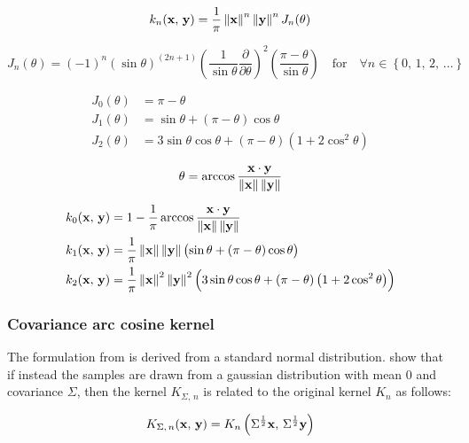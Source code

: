 \begin{equation}\label{eq:kernel_cho}
	k_n(\mathbf{x},\,\mathbf{y}) = \frac{1}{\pi} \left\lVert \mathbf{x} \right\rVert^n \left\lVert \mathbf{y} \right\rVert^n J_n(\theta)
\end{equation}

\begin{equation}
	J_n(\theta) = (-1)^n \left( \sin \theta \right)^{(2n+1)}
	\left( \frac{1}{\sin \theta} \frac{\partial}{\partial \theta} \right)^2
	\left( \frac{\pi - \theta}{\sin \theta} \right)
	\quad \text{for} \quad \forall n \in \left\{ 0,\,1,\,2,\,\dots \right\}
\end{equation}

\begin{align}
	J_0(\theta) & = \pi - \theta                                                                    \\
	J_1(\theta) & = \sin\theta + \left(\pi - \theta\right)\cos\theta                                \\
	J_2(\theta) & = 3\sin\theta\cos\theta + \left(\pi - \theta\right)\left(1 + 2\cos^2\theta\right)
\end{align}

\begin{equation}
	\theta = \arccos\frac{\mathbf{x} \cdot \mathbf{y}}{\left\lVert \mathbf{x} \right\rVert \left\lVert \mathbf{y} \right\rVert}
\end{equation}


\begin{align}
	k_0(\mathbf{x},\,\mathbf{y}) & = 1 - \frac{1}{\pi} \arccos\frac{\mathbf{x} \cdot \mathbf{y}}{\left\lVert \mathbf{x} \right\rVert \left\lVert \mathbf{y} \right\rVert} \\
	k_1(\mathbf{x},\,\mathbf{y}) & = \frac{1}{\pi} \left\lVert \mathbf{x} \right\rVert \left\lVert \mathbf{y} \right\rVert
	\bigl( \sin\theta + \left(\pi - \theta\right)\cos\theta \bigr)                                                        \\
	k_2(\mathbf{x},\,\mathbf{y}) & = \frac{1}{\pi} \left\lVert \mathbf{x} \right\rVert^2 \left\lVert \mathbf{y} \right\rVert^2
	\Bigl( 3\sin\theta\cos\theta + \left(\pi - \theta\right)\left(1 + 2\cos^2\theta\right) \Bigr)
\end{align}

\subsubsection{Covariance arc cosine kernel}

The formulation from \textcite{choLargemarginClassificationInfinite2010} is derived from a standard normal
distribution. \Textcite{pandeyGoDeepWide2014} show that if instead the samples are drawn from a gaussian
distribution with mean 0 and covariance $\Sigma$, then the kernel $K_{\Sigma,\,n}$ is related to the
original kernel $K_{n}$ as follows:

\begin{equation}\label{eq:kernel_pandey}
K_{\Sigma,\,n}(\mathbf{x},\,\mathbf{y}) = K_{n}\left(\Sigma^{\frac{1}{2}}\mathbf{x},\,\Sigma^{\frac{1}{2}}\mathbf{y}\right)
\end{equation}
